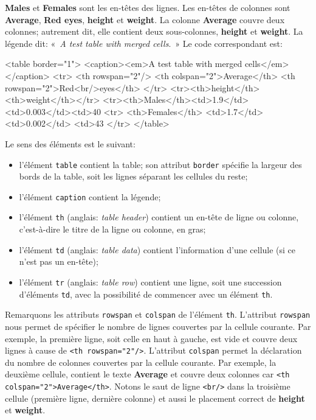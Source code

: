\textbf{Males} et \textbf{Females} sont les en-têtes des lignes. Les
en-têtes de colonnes sont \textbf{Average}, \textbf{Red eyes},
\textbf{height} et \textbf{weight}.\! La colonne \textbf{Average}
couvre deux colonnes; autrement dit, elle contient deux sous-colonnes,
\textbf{height} et \textbf{weight}. La légende dit: «~\emph{A test
  table with merged cells}.~» Le code \HTML correspondant est:
\begin{sverb}
<table border="1">
  <caption><em>A test table with merged cells</em></caption>
  <tr>
    <th rowspan="2"/>
    <th colspan="2">Average</th>
    <th rowspan="2">Red<br/>eyes</th>
  </tr>
  <tr><th>height</th><th>weight</th></tr>
  <tr><th>Males</th><td>1.9</td><td>0.003</td><td>40%
  <tr>
    <th>Females</th>
    <td>1.7</td>
    <td>0.002</td>
    <td>43%
  </tr>
</table>
\end{sverb}
Le sens des éléments est le suivant:
\begin{itemize}

\item l'élément \texttt{table} contient la table; son attribut
  \texttt{border} spécifie la largeur des bords de la table, soit les
  lignes séparant les cellules du reste;

\item l'élément \texttt{caption} contient la légende;

\item l'élément \texttt{th} (anglais: \emph{table header}) contient un
  en-tête de ligne ou colonne, c'est-à-dire le titre de la ligne ou
  colonne, en gras;

\item l'élément \texttt{td} (anglais: \emph{table data}) contient
  l'information d'une cellule (si ce n'est pas un en-tête);

\item l'élément \texttt{tr} (anglais: \emph{table row}) contient une
  ligne, soit une succession d'éléments \texttt{td}, avec la
  possibilité de commencer avec un élément \texttt{th}.

\end{itemize}
Remarquons les attributs \texttt{rowspan} et \texttt{colspan} de
l'élément \texttt{th}. L'attribut \texttt{rowspan} nous permet de
spécifier le nombre de lignes couvertes par la cellule courante. Par
exemple, la première ligne, soit celle en haut à gauche, est vide et
couvre deux lignes à cause de \verb|<th rowspan="2"/>|. L'attribut
\texttt{colspan} permet la déclaration du nombre de colonnes couvertes
par la cellule courante. Par exemple, la deuxième cellule, contient le
texte \textbf{Average} et couvre deux colonnes car
\verb|<th colspan="2">Average</th>|. Notons le saut de ligne
\verb|<br/>| dans la troisième cellule (première ligne, dernière
colonne) et aussi le placement correct de \textbf{height} et
\textbf{weight}.

